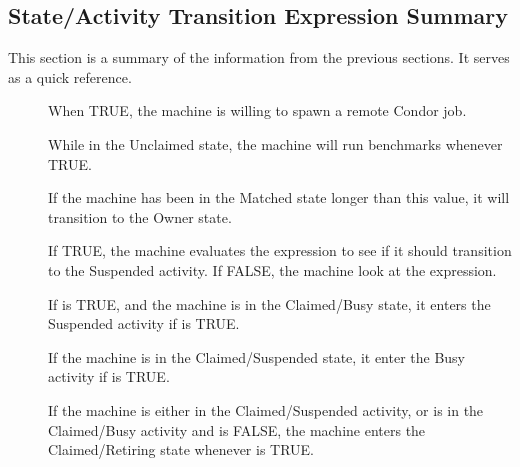 \subsection{\label{sec:State-Expression-Summary}
State/Activity Transition Expression Summary}
This section is a summary of the information from the
previous sections.
It serves as a quick reference.

\begin{description}
  
\item[] When TRUE, the machine is willing to spawn
  a remote Condor job.
  
\item[] While in the Unclaimed state, the machine
  will run benchmarks whenever TRUE.
  
\item[] If the machine has been in the Matched
  state longer than this value, it will transition to the Owner state.
  
\item[] If TRUE, the machine evaluates
  the  expression to see if it should transition to the
  Suspended activity.  If FALSE, the machine look at
  the  expression.
  
\item[] If  is TRUE, and the machine
  is in the Claimed/Busy state, it enters the Suspended activity
  if  is TRUE.
  
\item[] If the machine is in the Claimed/Suspended
  state, it enter the Busy activity if  is TRUE.
  
\item[] If the machine is either in the Claimed/Suspended
  activity, or is in the Claimed/Busy activity and
   is FALSE, the machine enters the Claimed/Retiring
  state whenever  is TRUE. 


\end{description}
